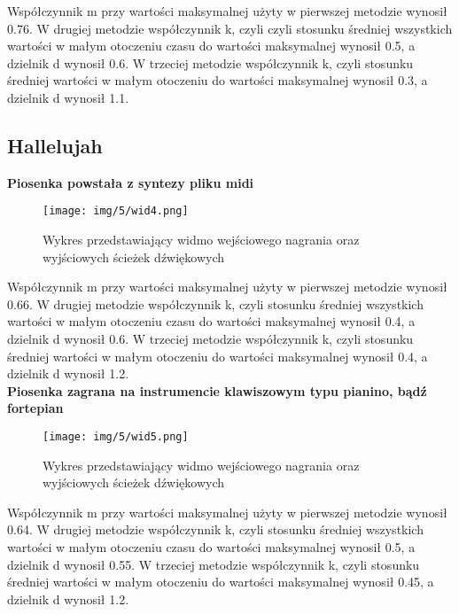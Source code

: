 \noindent Współczynnik m przy wartości maksymalnej użyty w pierwszej metodzie wynosił 0.76.
W drugiej metodzie współczynnik k, czyli czyli stosunku średniej wszystkich wartości w małym otoczeniu czasu do wartości maksymalnej wynosił 0.5, a dzielnik d wynosił 0.6.
W trzeciej metodzie współczynnik k, czyli stosunku średniej wartości w małym otoczeniu do wartości maksymalnej wynosił 0.3, a dzielnik d wynosił 1.1.

\newpage
\subsection{Hallelujah}

\textbf{Piosenka powstała z syntezy pliku midi}

\begin{figure}[h]
  \centering
  \texttt{[image: img/5/wid4.png]}
  \caption{Wykres przedstawiający widmo wejściowego nagrania oraz \\wyjściowych ścieżek dźwiękowych}
\end{figure}

\noindent Współczynnik m przy wartości maksymalnej użyty w pierwszej metodzie wynosił 0.66.
W drugiej metodzie współczynnik k, czyli stosunku średniej wszystkich wartości w małym otoczeniu czasu do wartości maksymalnej wynosił 0.4, a dzielnik d wynosił 0.6.
W trzeciej metodzie współczynnik k, czyli stosunku średniej wartości w małym otoczeniu do wartości maksymalnej wynosił 0.4, a dzielnik d wynosił 1.2.\\

\textbf{Piosenka zagrana na instrumencie klawiszowym typu pianino, bądź fortepian}

\begin{figure}[h]
  \centering
  \texttt{[image: img/5/wid5.png]}
  \caption{Wykres przedstawiający widmo wejściowego nagrania oraz \\wyjściowych ścieżek dźwiękowych}
\end{figure}

\noindent Współczynnik m przy wartości maksymalnej użyty w pierwszej metodzie wynosił 0.64.
W drugiej metodzie współczynnik k, czyli stosunku średniej wszystkich wartości w małym otoczeniu czasu do wartości maksymalnej wynosił 0.5, a dzielnik d wynosił 0.55.
W trzeciej metodzie współczynnik k, czyli stosunku średniej wartości w małym otoczeniu do wartości maksymalnej wynosił 0.45, a dzielnik d wynosił 1.2.\\


